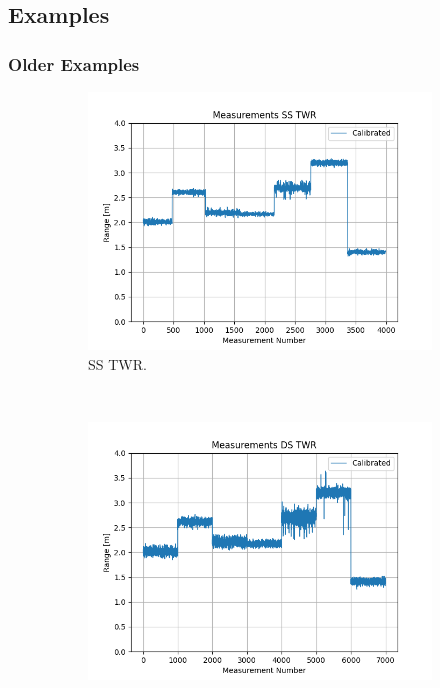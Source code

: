 \documentclass{decar-wsd}    %
\begin{document}
\clearpage
\subsection{Examples}

\subsubsection{Older Examples}

\begin{figure}[h]
    \centering
    \begin{subfigure}[t]{0.5\textwidth}
        \centering
        \includegraphics[width=\columnwidth]{figs/ss_twr.png}
        \caption{SS TWR.}
    \end{subfigure}%
    ~ 
    \begin{subfigure}[t]{0.5\textwidth}
        \centering
        \includegraphics[width=\columnwidth]{figs/ds_twr.png}

\end{subfigure}
\end{figure}
\end{document}
